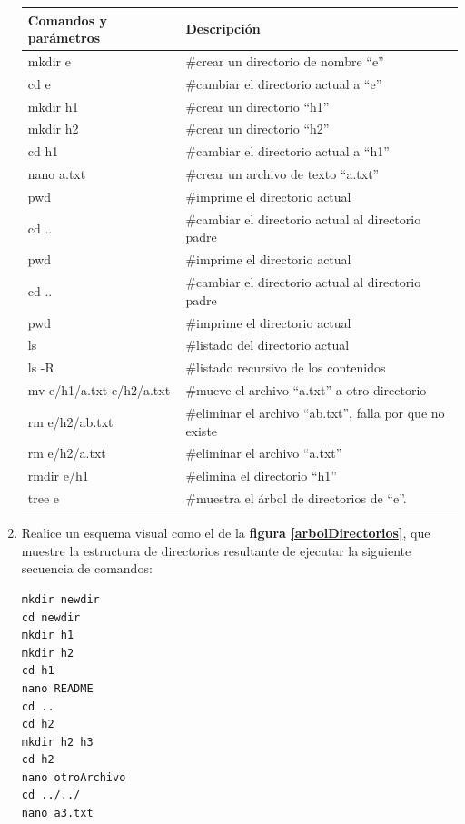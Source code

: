 \documentclass[12pt]{article}
\begin{document}
\begin{enumerate}[resume]
\begin{center}
    \begin{tabular}[t]{l l }
    \hline
        \textbf{Comandos y parámetros} & \textbf{Descripción} \\
    \hline
    \hline
        mkdir e &  \#crear un directorio de nombre ``e'' \\
        cd e &  \#cambiar el directorio actual a ``e'' \\
        mkdir h1 &  \#crear un directorio ``h1'' \\
        mkdir h2 &  \#crear un directorio ``h2'' \\
        cd h1 &  \#cambiar el directorio actual a ``h1'' \\
        nano a.txt &  \#crear un archivo de texto ``a.txt''\\
        pwd &  \#imprime el directorio actual\\
        cd .. &  \#cambiar el directorio actual al directorio padre \\
        pwd &  \#imprime el directorio actual \\
        cd .. &  \#cambiar el directorio actual al directorio padre \\
        pwd &  \#imprime el directorio actual \\
        ls &  \#listado del directorio actual \\
        ls -R &  \#listado recursivo de los contenidos \\
        mv e/h1/a.txt e/h2/a.txt &  \#mueve el archivo ``a.txt'' a otro directorio \\
        rm e/h2/ab.txt &  \#eliminar el archivo ``ab.txt'', falla por que no
        existe\\
        rm e/h2/a.txt &  \#eliminar el archivo ``a.txt'' \\
        rmdir e/h1 &  \#elimina el directorio ``h1'' \\
        tree e & \#muestra el árbol de directorios de ``e''.\\
    \hline
    \end{tabular}

\end{center}

    \item Realice un esquema visual como el de la \textbf{figura
        \ref{arbolDirectorios}}, que muestre la estructura de directorios
        resultante de ejecutar la siguiente secuencia de comandos:

        \begin{verbatim}
mkdir newdir
cd newdir
mkdir h1
mkdir h2
cd h1
nano README
cd ..
cd h2
mkdir h2 h3
cd h2
nano otroArchivo
cd ../../
nano a3.txt
        \end{verbatim}


\end{enumerate}
\end{document}

